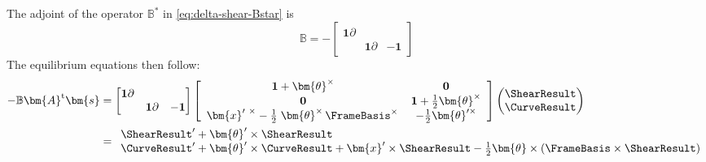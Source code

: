 The adjoint of the operator \(\mathbb{B}^*\) in \eqref{eq:delta-shear-Bstar} is
\begin{equation}
\mathbb{B} 
= -\begin{bmatrix}
  \mathbf{1}\partial & & \\
& \mathbf{1}\partial & -\mathbf{1}
\end{bmatrix}
\label{eq:delta-shear-Bequi}
\end{equation}
The equilibrium equations then follow:
\begin{equation*}
\begin{aligned}
-\mathbb{B}\bm{A}^{\mathrm{t}} \bm{s}
&= 
\begin{bmatrix}
\mathbf{1}\partial & & \\
 & \mathbf{1}\partial & -\mathbf{1}
\end{bmatrix}
\left[\begin{array}{ccc}
\mathbf{1} + \bm{\theta}^{\times}& \mathbf{0} \\
\mathbf{0} & \mathbf{1} + \frac{1}{2}\bm{\theta}^{\times} \\
{\bm{x}}^{\prime~\times} - \frac{1}{2}\left.\bm{\theta}^{\times}\,\FrameBasis^{\times}\right. & -\frac{1}{2}\bm{\theta}^{\prime \times} 
\end{array}\right] \begin{pmatrix}
\ShearResult \\ \CurveResult
\end{pmatrix} \\
%
&= \begin{array}{l}
\ShearResult' + \bm{\theta}'\times\ShearResult \\
\CurveResult' +  \bm{\theta}' \times \CurveResult + \bm{x}'\times\ShearResult - \frac{1}{2} \bm{\theta}\times(\FrameBasis \times\ShearResult)
\end{array}
\end{aligned}
\end{equation*}


